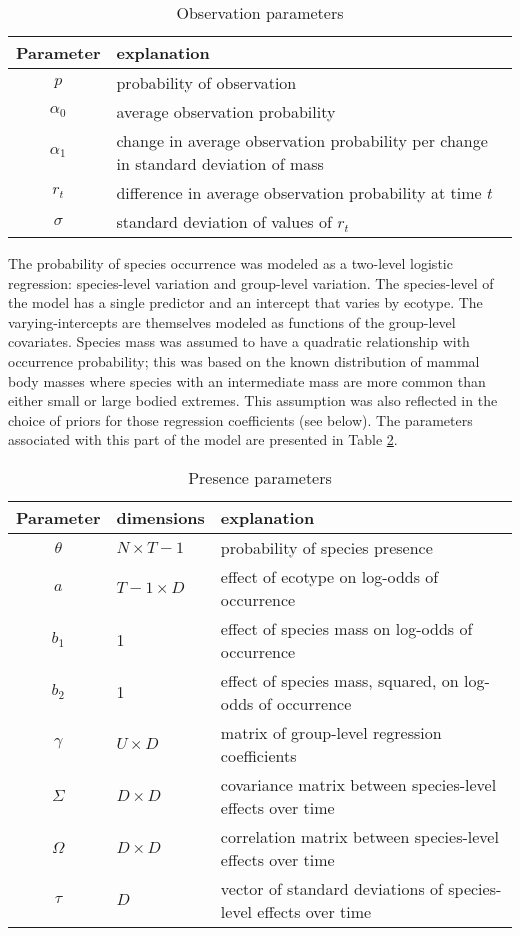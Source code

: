 \documentclass[12pt,letterpaper]{article}
\begin{document}
\begin{table}
  \centering
  \begin{tabular}{c l}
    Parameter & explanation \\
    \hline
    \(p\) & probability of observation \\
    \(\alpha_{0}\) & average observation probability \\
    \(\alpha_{1}\) & change in average observation probability per change in standard deviation of mass \\
    \(r_{t}\) & difference in average observation probability at time \(t\) \\
    \(\sigma\) & standard deviation of values of \(r_{t}\) \\
  \end{tabular}
  \caption{Observation parameters}
  \label{tab:obs_param}
\end{table}


The probability of species occurrence was modeled as a two-level logistic regression: species-level variation and group-level variation. The species-level of the model has a single predictor and an intercept that varies by ecotype. The varying-intercepts are themselves modeled as functions of the group-level covariates. Species mass was assumed to have a quadratic relationship with occurrence probability; this was based on the known distribution of mammal body masses where species with an intermediate mass are more common than either small or large bodied extremes. This assumption was also reflected in the choice of priors for those regression coefficients (see below). The parameters associated with this part of the model are presented in Table \ref{tab:pres_param}. 

\begin{table}
  \centering
  \begin{tabular}{c l l}
    Parameter & dimensions & explanation \\
    \hline
    \(\theta\) & \(N \times T - 1\) & probability of species presence \\
    \(a\) & \(T - 1 \times D\) & effect of ecotype on log-odds of occurrence \\
    \(b_{1}\) & 1 & effect of species mass on log-odds of occurrence \\
    \(b_{2}\) & 1 & effect of species mass, squared, on log-odds of occurrence \\
    \(\gamma\) & \(U \times D\) & matrix of group-level regression coefficients \\
    \(\Sigma\) & \(D \times D\) & covariance matrix between species-level effects over time \\
    \(\Omega\) & \(D \times D\) & correlation matrix between species-level effects over time \\
    \(\tau\) & \(D\) & vector of standard deviations of species-level effects over time\\
  \end{tabular}
  \caption{Presence parameters}
  \label{tab:pres_param}
\end{table}
\end{document}
